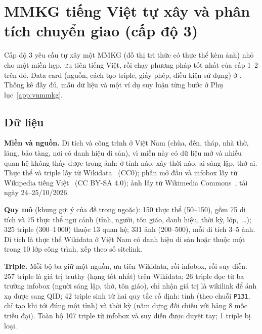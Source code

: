 \section{MMKG tiếng Việt tự xây và phân tích chuyển giao (cấp độ 3)}\label{sec:vnmmkg}

Cấp độ 3 yêu cầu tự xây một MMKG (đồ thị tri thức có thực thể kèm ảnh) nhỏ cho một miền hẹp, ưu tiên tiếng Việt,
rồi chạy phương pháp tốt nhất của cấp 1--2 trên đó. Data card (nguồn, cách tạo triple, giấy phép, điều kiện sử
dụng) ở . Thống kê đầy đủ, mẫu dữ liệu và một ví dụ suy luận từng bước ở Phụ lục~\ref{app:vnmmkg}.

\subsection{Dữ liệu}\label{sec:vn-data}

\textbf{Miền và nguồn.} Di tích và công trình ở Việt Nam (chùa, đền, tháp, nhà thờ, lăng, bảo tàng, nơi có danh
hiệu di sản), vì miền này có dữ liệu mở và nhiều quan hệ không thấy được trong ảnh: ở tỉnh nào, xây thời nào, ai
sáng lập, thờ ai. Thực thể và triple lấy từ Wikidata~\cite{vn-vrandecic2014wikidata} (CC0); phần mở đầu và
infobox lấy từ Wikipedia tiếng Việt~\cite{vn-viwiki} (CC BY-SA 4.0); ảnh lấy từ Wikimedia
Commons~\cite{vn-commons}, tải ngày 24--25/10/2026.

\textbf{Quy mô} (khung gợi ý của đề trong ngoặc): 150 thực thể (50--150), gồm 75 di tích và 75 thực thể ngữ cảnh
(tỉnh, người, tôn giáo, danh hiệu, thời kỳ, lớp,~\ldots); 325 triple (300--1\,000) thuộc 13 quan hệ; 331 ảnh
(200--500), mỗi di tích 3--5 ảnh. Di tích là thực thể Wikidata ở Việt Nam có danh hiệu di sản hoặc thuộc một
trong 10 lớp công trình, xếp theo số sitelink.

\textbf{Triple.} Mỗi bộ ba giữ một nguồn, ưu tiên Wikidata, rồi infobox, rồi suy diễn. 257 triple là giá trị
truthy (hạng tốt nhất) trên Wikidata; 26 triple đọc từ ba trường infobox (người sáng lập, thờ, tôn giáo), chỉ nhận
giá trị là wikilink để ánh xạ được sang QID; 42 triple sinh từ hai quy tắc cố định: tỉnh (theo chuỗi
\texttt{P131}, chỉ tạo khi tới đúng một tỉnh) và thời kỳ (năm dựng đối chiếu với bảng 8 mốc triều đại). Toàn bộ
107 triple từ infobox và suy diễn được duyệt tay; 1 triple bị loại.


